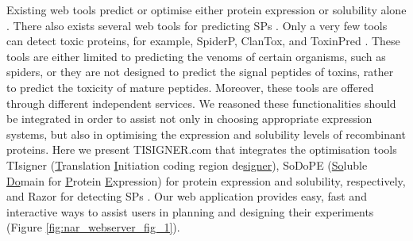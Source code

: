 Existing web tools predict or optimise either protein expression or
solubility alone
\cite{Agostini2014-te,Chin2014-wu,Grote2005-vr,Puigbo2007-oj,Hebditch2017-bg,Hon2020-gk,Smialowski2012-yg,Sormanni2015-yr,Zayni2018-wc}.
There also exists several web tools for predicting SPs
\cite{Almagro_Armenteros2019-vr,Bagos2009-wh,Hiller2004-gc,Kall2004-te,Savojardo2017-ux}.
Only a very few tools can detect toxic proteins, for example, SpiderP, ClanTox,
and ToxinPred \cite{Gupta2013-fw,Naamati2009-uf,Wong2013-qh}. 
These tools are either limited to predicting the
venoms of certain organisms, such as spiders, or they are not designed
to predict the signal peptides of toxins, rather to predict the toxicity
of mature peptides.
Moreover, these tools are offered through different independent
services. We reasoned these functionalities should be integrated in
order to assist not only in choosing appropriate expression systems, but
also in optimising the expression and solubility levels of recombinant
proteins. Here we present TISIGNER.com that integrates the optimisation
tools TIsigner (\underline{T}ranslation \underline{I}nitiation coding
region de\underline{signer}), SoDoPE (\underline{So}luble
\underline{Do}main for \underline{P}rotein \underline{E}xpression) for
protein expression and solubility, respectively, and Razor for detecting
SPs \cite{bhandari2019highly,Bhandari2020-pz,Bhandari2020-oj}. Our web application provides easy, fast and interactive ways to
assist users in planning and designing their experiments (Figure \ref{fig:nar_webserver_fig_1}).

